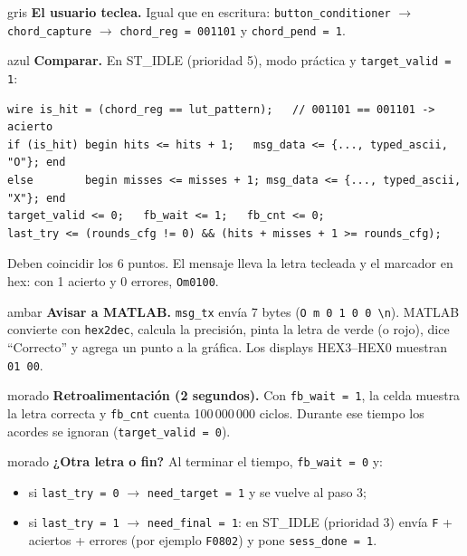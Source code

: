 \documentclass[11pt,a4paper]{article}
\newcommand{\cod}[1]{\texttt{#1}}
\begin{document}
\begin{paso}{gris}
\textbf{El usuario teclea.} Igual que en escritura:
\cod{button\_conditioner} $\to$ \cod{chord\_capture} $\to$ \cod{chord\_reg = 001101}
y \cod{chord\_pend = 1}.
\end{paso}

\begin{paso}{azul}
\textbf{Comparar.} En ST\_IDLE (prioridad 5), modo práctica y
\cod{target\_valid = 1}:
\begin{lstlisting}
wire is_hit = (chord_reg == lut_pattern);   // 001101 == 001101 -> acierto
if (is_hit) begin hits <= hits + 1;   msg_data <= {..., typed_ascii, "O"}; end
else        begin misses <= misses + 1; msg_data <= {..., typed_ascii, "X"}; end
target_valid <= 0;   fb_wait <= 1;   fb_cnt <= 0;
last_try <= (rounds_cfg != 0) && (hits + misses + 1 >= rounds_cfg);
\end{lstlisting}
Deben coincidir los 6 puntos. El mensaje lleva la letra tecleada y el marcador en
hex: con 1 acierto y 0 errores, \cod{Om0100}.
\end{paso}

\begin{paso}{ambar}
\textbf{Avisar a MATLAB.} \cod{msg\_tx} envía 7 bytes
(\cod{O m 0 1 0 0 \textbackslash n}). MATLAB convierte con \cod{hex2dec}, calcula la
precisión, pinta la letra de verde (o rojo), dice ``Correcto'' y agrega un punto a la
gráfica. Los displays HEX3--HEX0 muestran \cod{01 00}.
\end{paso}

\begin{paso}{morado}
\textbf{Retroalimentación (2 segundos).} Con \cod{fb\_wait = 1}, la
celda muestra la letra correcta y \cod{fb\_cnt} cuenta 100\,000\,000 ciclos. Durante
ese tiempo los acordes se ignoran (\cod{target\_valid = 0}).
\end{paso}

\begin{paso}{morado}
\textbf{¿Otra letra o fin?} Al terminar el tiempo, \cod{fb\_wait = 0} y:
\begin{itemize}[leftmargin=*]
  \item si \cod{last\_try = 0} $\to$ \cod{need\_target = 1} y se vuelve al paso 3;
  \item si \cod{last\_try = 1} $\to$ \cod{need\_final = 1}: en ST\_IDLE (prioridad 3)
        envía \cod{F} + aciertos + errores (por ejemplo \cod{F0802}) y pone
        \cod{sess\_done = 1}.
\end{itemize}
\end{paso}
\end{document}
